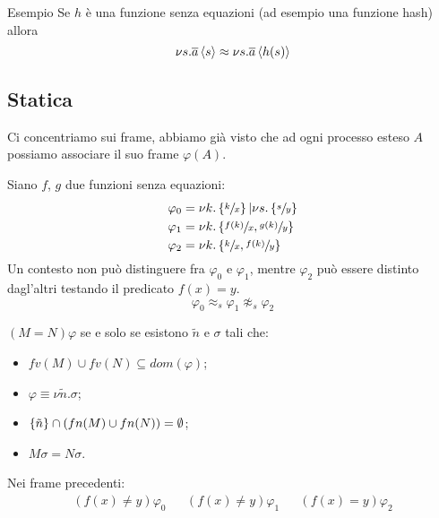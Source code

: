 \begin{frame}{Esempio}
  Se $h$ \`e una funzione senza equazioni (ad esempio una funzione
  hash) allora
  \[ \nu s. \overline{a}\left<s\right> \approx \nu s. \overline{a}\left<h(s)\right> \]
\end{frame}

\subsection{Statica}

\begin{frame}
  Ci concentriamo sui frame, abbiamo gi\`a visto che ad ogni processo
  esteso $A$ possiamo associare il suo frame $\varphi (A)$.
  \vfill
  
  Siano $f$, $g$ due funzioni senza equazioni:
  \begin{align*}
    \varphi _0 &= \nu k.\left\{\sfrac{k}{x}\right\} | \nu s. \left\{\sfrac{s}{y}\right\}
    \\
    \varphi _1 &= \nu k.\left\{ \sfrac{f(k)}{x}, \sfrac{g(k)}{y}\right\} \\
    \varphi _2 &= \nu k.\left\{ \sfrac{k}{x}, \sfrac{f(k)}{y}\right\} 
  \end{align*}
  Un contesto non pu\`o distinguere fra $\varphi _0$ e $\varphi _1$,
  mentre $\varphi _2$ pu\`o essere distinto dagl'altri testando il
  predicato $f(x) = y$.
  \[ \varphi _0 \approx _s \varphi _1 \not \approx _s \varphi _2 \]
\end{frame}

\begin{frame}
  \begin{mydef}
    $(M=N)\varphi$ se e solo se esistono $\tilde n$ e $\sigma$ tali che:
    \begin{itemize}
    \item $fv(M) \cup fv(N) \subseteq dom(\varphi)$;
    \item $\varphi \equiv \nu \tilde n.\sigma$;
    \item $\left\{\tilde n\right\} \cap( fn(M) \cup fn(N)) = \emptyset$;
    \item $M\sigma = N\sigma$.
    \end{itemize}
  \end{mydef}
  \vfill
  
  Nei frame precedenti:
  \begin{align*}
    (f(x) \neq y)\varphi _0 && (f(x) \neq y)\varphi _1 && (f(x) =
                                                        y)\varphi _2
  \end{align*}
\end{frame}

